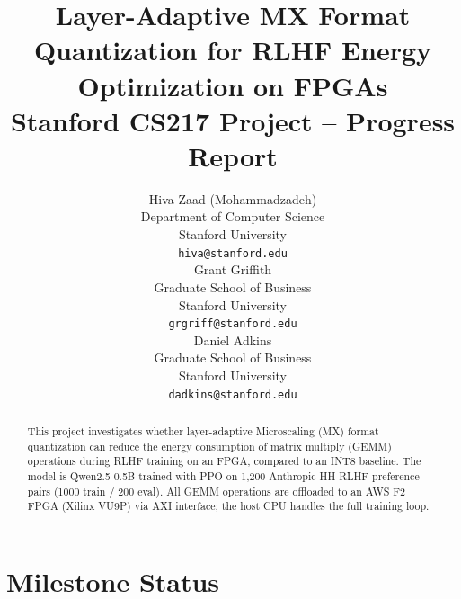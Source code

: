 \documentclass[10pt]{article}
\title{
  Layer-Adaptive MX Format Quantization for RLHF Energy Optimization on FPGAs \\
  \vspace{0.5em}
  \small{\normalfont Stanford CS217 Project -- Progress Report}  %
}
\author{
  Hiva Zaad (Mohammadzadeh) \\
  Department of Computer Science \\
  Stanford University \\
  \texttt{hiva@stanford.edu} \\
  \And
  Grant Griffith \\
  Graduate School of Business \\
  Stanford University \\
  \texttt{grgriff@stanford.edu} \\
  \And
  Daniel Adkins \\
 Graduate School of Business \\
  Stanford University \\
  \texttt{dadkins@stanford.edu}
}
\begin{document}
\maketitle
\vspace{-1em}

\begin{abstract}
\small
This project investigates whether layer-adaptive Microscaling (MX) format quantization can reduce the energy consumption of matrix multiply (GEMM) operations during RLHF training on an FPGA, compared to an INT8 baseline. The model is Qwen2.5-0.5B trained with PPO on 1,200 Anthropic HH-RLHF preference pairs (1000 train / 200 eval). All GEMM operations are offloaded to an AWS F2 FPGA (Xilinx VU9P) via AXI interface; the host CPU handles the full training loop.
\end{abstract}
\vspace{-0.5em}

\section{Milestone Status}
\vspace{-0.3em}
\end{document}
